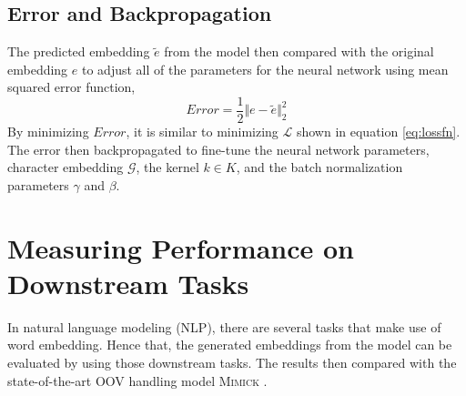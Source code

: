     \subsection{Error and Backpropagation}
        The predicted embedding $\tilde{e}$ from the model then
        compared with the original embedding $e$ to adjust all of the
        parameters for the neural network using mean squared error
        function,
        \begin{equation}
            \label{eq:errorf}
            Error = \frac{1}{2} \Vert e - \tilde{e} \Vert ^{2}_2
        \end{equation}
        By minimizing $Error$, it is similar to minimizing
        $\mathcal{L}$ shown in equation \ref{eq:lossfn}. The error
        then backpropagated to fine-tune the neural network
        parameters, character embedding $\mathcal{G}$, the kernel $k
        \in K$, and the batch normalization parameters $\gamma$ and
        $\beta$.
        
\section{Measuring Performance on Downstream Tasks}
    In natural language modeling (NLP), there are several tasks that
    make use of word embedding. Hence that, the generated embeddings
    from the model can be evaluated by using those downstream tasks.
    The results then compared with the state-of-the-art OOV handling
    model \textsc{Mimick} \citep{mimicking2017Pinter}.
    
